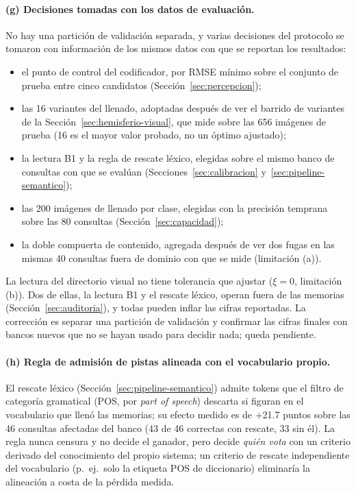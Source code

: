 \paragraph{(g) Decisiones tomadas con los datos de evaluación.}
No hay una partición de validación separada, y varias decisiones del protocolo se
tomaron con información de los mismos datos con que se reportan los resultados:
\begin{itemize}
    \item el punto de control del codificador, por RMSE mínimo sobre el conjunto de
    prueba entre cinco candidatos (Sección~\ref{sec:percepcion});
    \item las 16 variantes del llenado, adoptadas después de ver el barrido de variantes
    de la Sección~\ref{sec:hemisferio-visual}, que mide sobre las 656 imágenes de
    prueba (16 es el mayor valor probado, no un óptimo ajustado);
    \item la lectura B1 y la regla de rescate léxico, elegidas sobre el mismo banco de
    consultas con que se evalúan (Secciones~\ref{sec:calibracion}
    y~\ref{sec:pipeline-semantico});
    \item las 200 imágenes de llenado por clase, elegidas con la precisión temprana sobre
    las 80 consultas (Sección~\ref{sec:capacidad});
    \item la doble compuerta de contenido, agregada después de ver dos fugas en las
    mismas 40 consultas fuera de dominio con que se mide (limitación (a)).
\end{itemize}
La lectura del directorio visual no tiene tolerancia que ajustar ($\xi = 0$,
limitación (b)).
Dos de ellas, la lectura B1 y el rescate léxico, operan fuera de las memorias
(Sección~\ref{sec:auditoria}), y todas pueden inflar las cifras reportadas.
La corrección es separar una partición de validación y confirmar las cifras finales con
bancos nuevos que no se hayan usado para decidir nada; queda pendiente.

\paragraph{(h) Regla de admisión de pistas alineada con el vocabulario propio.}
El rescate léxico (Sección~\ref{sec:pipeline-semantico}) admite tokens que el filtro
de categoría gramatical (POS, por \textit{part of speech}) descarta si figuran en el
vocabulario que llenó las memorias; su efecto medido es de +21.7 puntos sobre las 46
consultas afectadas del banco (43 de 46 correctas con rescate, 33 sin él).
La regla nunca censura y no decide el ganador, pero decide \emph{quién vota} con un
criterio derivado del conocimiento del propio sistema; un criterio de rescate
independiente del vocabulario (p.\ ej.\ solo la etiqueta POS de diccionario) eliminaría
la alineación a costa de la pérdida medida.

